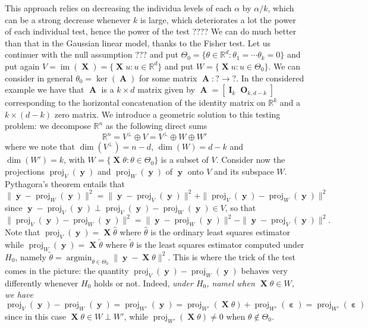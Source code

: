 \documentclass[
	fontsize=11pt, %
	twoside=false, %
	numbers=noenddot, %
]{kaobook}
\DeclareMathOperator{\bA}{\boldsymbol A}
\DeclareMathOperator{\bI}{\boldsymbol I}
\DeclareMathOperator{\bO}{\boldsymbol O}
\DeclareMathOperator{\bX}{\boldsymbol X}
\DeclareMathOperator{\by}{\boldsymbol y}
\DeclareMathOperator{\beps}{\boldsymbol \varepsilon}
\DeclareMathOperator{\im}{im}
\DeclareMathOperator*{\argmin}{argmin}
\DeclareMathOperator{\proj}{proj}
\newcommand{\R}{\mathbb R}
\newcommand{\wh}{\widehat}
\newcommand{\norm}[1]{\|#1\|}
\begin{document}
This approach relies on decreasing the individua levels of each $\alpha$ by $\alpha / k$, which can be a strong decrease whenever $k$ is large, which deteriorates a lot the power of each individual test, hence the power of the test ????
We can do much better than that in the Gaussian linear model, thanks to the Fisher test.
Let us continuer with the null assumption ??? and put $\Theta_0 = \{ \theta \in \R^d : \theta_1 = \cdots \theta_k = 0 \}$ and put again $V = \im(\bX) = \{ \bX u : u \in \R^d\}$ and put $W = \{ \bX u : u \in \Theta_0 \}$. We can consider in general $\theta_0 = \ker(\bA)$ for some matrix $\bA : ? \rightarrow ?$. In the considered example we have that $\bA$ is a $k \times d$ matrix given by 
$\bA = [\bI_k \bO_{k, d-k}]$ corresponding to the horizontal concatenation of the identity matrix on $\R^k$ and a $k \times (d-k)$ zero matrix.
We introduce a geometric solution to this testing problem: we decompose $\R^n$ as the following direct sums
\begin{equation*}
	\R^n = V^\perp \oplus V = V^\perp \oplus W \oplus W'
\end{equation*}
where we note that $\dim(V^\perp) = n - d$, $\dim(W) = d - k$ and $\dim(W') = k$, with $W = \{ \bX \theta : \theta \in \Theta_0 \}$ is a subset of $V$.
Consider now the projections $\proj_V(\by)$ and $\proj_W(\by)$ of $\by$ onto $V$ and its subspace $W$.
Pythagora's theorem entails that $\norm{\by - \proj_W(\by)}^2 = \norm{\by - \proj_V(\by)}^2 + \norm{\proj_V(\by) - \proj_W(\by)}^2$ since $\by - \proj_V(\by) \perp \proj_V(\by) - \proj_W(\by) \in V$, so that 
\begin{equation*}
	\norm{\proj_V(\by) - \proj_W(\by)}^2 = \norm{\by - \proj_W(\by)}^2 - \norm{\by - \proj_V(\by)}^2.
\end{equation*}
Note that $\proj_V(\by) = \bX \wh \theta$ where $\wh \theta$ is the ordinary least squares estimator while $\proj_W(\by) = \bX \tilde \theta$ where $\tilde \theta$ is the least squares estimator computed under $H_0$, namely $\tilde \theta = \argmin_{\theta \in \Theta_0} \norm{\by - \bX \theta}^2$.
This is where the trick of the test comes in the picture: the quantity $\proj_V(\by) - \proj_W(\by)$ behaves very differently whenever $H_0$ holds or not. Indeed, \emph{under $H_0$, namel when $\bX \theta \in W$, we have}
\begin{equation*}
	\proj_V(\by) - \proj_W(\by) = \proj_{W'} (\by) = \proj_{W'}(\bX \theta) + \proj_{W'}(\beps) = \proj_{W'}(\beps)
\end{equation*}
since in this case $\bX \theta \in W \perp W'$, while $\proj_{W'}(\bX \theta) \neq 0$ when $\theta \notin \Theta_0$.
\end{document}
